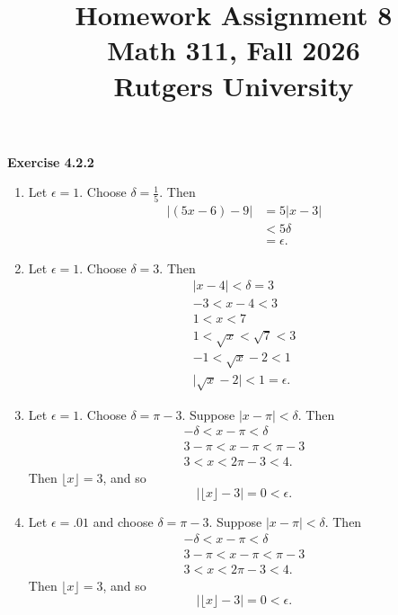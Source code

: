 \documentclass[12pt]{article}
\title{Homework Assignment 8 \\ \large Math 311, Fall 2026 \\ Rutgers University}
\author{}
\date{}
\begin{document}
\maketitle

\textbf{Exercise 4.2.2}
\begin{enumerate}[label=(\alph*)]
    \item Let \( \epsilon = 1 \). Choose \( \delta = \frac{1}{5} \). Then
          \[
              \begin{split}
                  \vert (5x - 6) - 9 \vert & = 5 \vert x-3 \vert \\
                                           & < 5 \delta          \\
                                           & = \epsilon.
              \end{split}
          \]
    \item      Let \( \epsilon = 1 \). Choose \( \delta = 3 \). Then
          \[
              \begin{split}
                  \vert x - 4 \vert < \delta = 3 \\
                  -3 < x - 4 < 3                 \\
                  1 < x < 7                      \\
                  1 < \sqrt{x} < \sqrt{7} < 3    \\
                  -1 < \sqrt{x} - 2 < 1          \\
                  \vert \sqrt{x} - 2 \vert < 1 = \epsilon.
              \end{split}
          \]
    \item  Let \( \epsilon = 1 \). Choose \( \delta = \pi - 3 \). Suppose \( \vert x - \pi  \vert < \delta  \). Then
          \[
              \begin{split}
                  -\delta < x - \pi < \delta  \\
                  3 - \pi < x - \pi < \pi - 3 \\
                  3 < x < 2 \pi - 3 < 4.
              \end{split}
          \]
          Then \( \lfloor x \rfloor = 3 \), and so
          \[
              \vert \lfloor x \rfloor  -3  \vert = 0 < \epsilon.
          \]

    \item Let \( \epsilon = .01 \) and choose \( \delta = \pi - 3 \). Suppose \( \vert x - \pi \vert < \delta  \). Then
          \[
              \begin{split}
                  -\delta < x - \pi < \delta  \\
                  3 - \pi < x - \pi < \pi - 3 \\
                  3 < x < 2 \pi - 3 < 4.
              \end{split}
          \]
          Then \( \lfloor x \rfloor = 3 \), and so
          \[
              \vert \lfloor x \rfloor  -3  \vert = 0 < \epsilon.
          \]
\end{enumerate}
\end{document}
